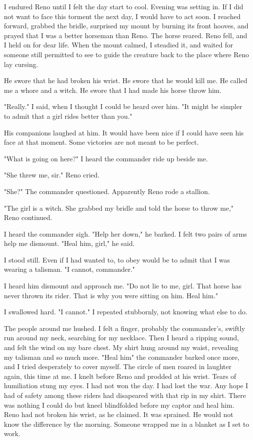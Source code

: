 \documentclass{article}
\begin{document}
I endured Reno until I felt the day start to cool. Evening was setting in. If I did not want to face this torment the next day, I would have to act soon. I reached forward, grabbed the bridle, surprised my mount by burning its front hooves, and prayed that I was a better horseman than Reno. The horse reared. Reno fell, and I held on for dear life. When the mount calmed, I steadied it, and waited for someone still permitted to see  to guide the creature back to the place where Reno lay cursing. 

He swore that he had broken his wrist. He swore that he would kill me. He called me a whore and a witch. He swore that I had made his horse throw him. 

"Really." I said, when I thought I could be heard over him. "It might be simpler to admit that a girl rides better than you."

His companions laughed at him. It would have been nice if I could have seen his face at that moment. Some victories are not meant to be perfect.

"What is going on here?" I heard the commander ride up beside me. 

"She threw me, sir." Reno cried.

"She?" The commander questioned. Apparently Reno rode a stallion.

"The girl is a witch. She grabbed my bridle and told the horse to throw me," Reno continued. 

I heard the commander sigh. "Help her down," he barked. I felt two pairs of arms help me dismount. "Heal him, girl," he said.

I stood still. Even if I had wanted to, to obey would be to admit that I was wearing a talisman. "I cannot, commander."

I heard him dismount and approach me. "Do not lie to me, girl. That horse has never thrown its rider. That is why you were sitting on him. Heal him."

I swallowed hard. "I cannot." I repeated stubbornly, not knowing what else to do.

The people around me hushed. I felt a finger, probably the commander's, swiftly run around my neck, searching for my necklace. Then I heard a ripping sound, and felt the wind on my bare chest. My shirt hung around my waist, revealing my talisman and so much more. "Heal him" the commander barked once more, and I tried desperately to cover myself. The circle of men roared in laughter again, this time at me. I knelt before Reno and prodded at his wrist. Tears of humiliation stung my eyes. I had not won the day. I had lost the war. Any hope I had of safety among these riders had disapeared with that rip in my shirt. There was nothing I could do but kneel blindfolded before my captor and heal him. Reno had not broken his wrist, as he claimed. It was sprained. He would not know the difference by the morning. Someone wrapped me in a blanket as I set to work. 
\end{document}
